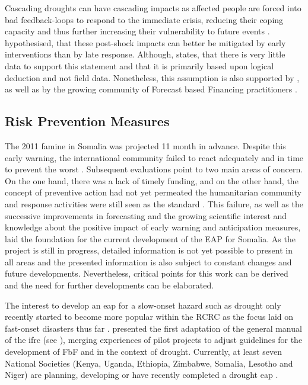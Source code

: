 Cascading droughts can have cascading impacts as affected people are forced into bad feedback-loops to respond to the immediate crisis, reducing their coping capacity and thus further increasing their vulnerability to future events \autocite{usaidEconomicsResilienceDrought2018}. \Textcite{usaidEconomicsResilienceDrought2018} hypothesised, that these post-shock impacts can better be mitigated by early interventions than by late response. Although, \autocite{usaidEconomicsResilienceDrought2018} states, that there is very little data to support this statement and that it is primarily based upon logical deduction and not field data. Nonetheless, this assumption is also supported by \textcite{aliMitigatingNaturalDisasters2017a}, \textcite{abdulkadirAssessmentDroughtRecurrence2017} as well as by the growing community of Forecast based Financing practitioners \autocite{gualazziniEWEAEarlyWarning2021, harrowsmithFutureForecastImpact2020}.

\subsection{Risk Prevention Measures}\label{subsec:case_eap}

The 2011 famine in Somalia was projected 11 month in advance. Despite this early warning, the international community failed to react adequately and in time to prevent the worst \autocite{stephensFORECASTBASEDACTION2015, hillbrunerWhenEarlyWarning2012}. Subsequent evaluations point to two main areas of concern. On the one hand, there was a lack of timely funding, and on the other hand, the concept of preventive action had not yet permeated the humanitarian community and response activities were still seen as the standard \autocite{stephensFORECASTBASEDACTION2015}. This failure, as well as the successive improvements in forecasting and the growing scientific interest and knowledge about the positive impact of early warning and anticipation measures, laid the foundation for the current development of the EAP for Somalia. As the project is still in progress, detailed information is not yet possible to present in all areas and the presented information is also subject to constant changes and future developments. Nevertheless, critical points for this work can be derived and the need for further developments can be elaborated.

The interest to develop an \acrshort{eap} for a slow-onset hazard such as drought only recently started to become more popular within the RCRC as the focus laid on fast-onset disasters thus far \autocite{rcrcFORECASTBASEDFINANCINGEARLY2020}. \Textcite{rcrcFORECASTBASEDFINANCINGEARLY2020} presented the first adaptation of the general manual of the \acrshort{ifrc} (see \textcite{ifrcFbFPractitionersManual2023b}), merging experiences of pilot projects to adjust guidelines for the development of FbF and  in the context of drought. Currently, at least seven National Societies (Kenya, Uganda, Ethiopia, Zimbabwe, Somalia, Lesotho and Niger) are planning, developing or have recently completed a drought \acrshort{eap} \autocite{lesothoredcrosssocietyEARLYACTIONPROTOCOL2022,nigerredcrosssocietyNigerDroughtEarly2021,rcrcFORECASTBASEDFINANCINGEARLY2020}.

